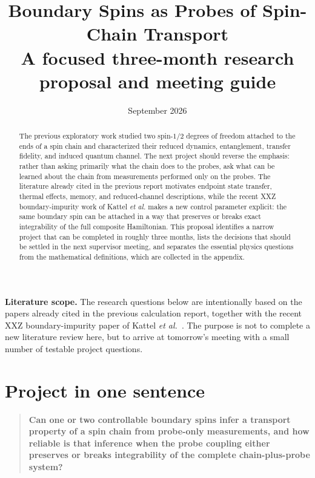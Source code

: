 \documentclass[11pt,a4paper]{article}
\begin{document}
\title{\textbf{Boundary Spins as Probes of Spin-Chain Transport}\\[2mm]
\large A focused three-month research proposal and meeting guide}
\author{}
\date{September 2026}
\maketitle

\begin{abstract}
The previous exploratory work studied two spin-$1/2$ degrees of freedom attached to the ends of a spin chain and characterized their reduced dynamics, entanglement, transfer fidelity, and induced quantum channel.  The next project should reverse the emphasis: rather than asking primarily what the chain does to the probes, ask what can be learned about the chain from measurements performed only on the probes.  The literature already cited in the previous report motivates endpoint state transfer, thermal effects, memory, and reduced-channel descriptions, while the recent XXZ boundary-impurity work of Kattel \emph{et al.} makes a new control parameter explicit: the same boundary spin can be attached in a way that preserves or breaks exact integrability of the full composite Hamiltonian.  This proposal identifies a narrow project that can be completed in roughly three months, lists the decisions that should be settled in the next supervisor meeting, and separates the essential physics questions from the mathematical definitions, which are collected in the appendix.
\end{abstract}

\noindent\textbf{Literature scope.}  The research questions below are intentionally based on the papers already cited in the previous calculation report, together with the recent XXZ boundary-impurity paper of Kattel \emph{et al.}~\cite{kattel2025}.  The purpose is not to complete a new literature review here, but to arrive at tomorrow's meeting with a small number of testable project questions.

\section{Project in one sentence}

\begin{quote}
\textbf{Can one or two controllable boundary spins infer a transport property of a spin chain from probe-only measurements, and how reliable is that inference when the probe coupling either preserves or breaks integrability of the complete chain-plus-probe system?}
\end{quote}
\end{document}

